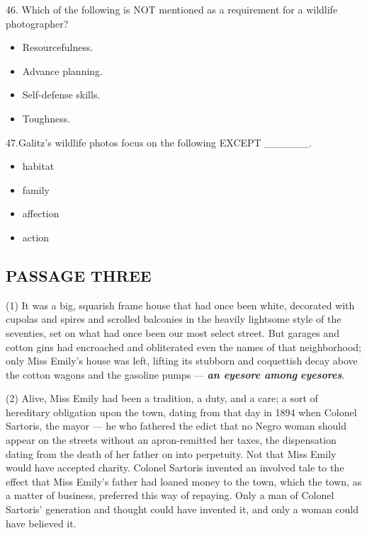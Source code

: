 \documentclass[UTF8,11pt]{ctexart}
\begin{document}
46. Which of the following is NOT mentioned as a requirement for a wildlife photographer?


\begin{itemize}[leftmargin=2em,itemsep=.2em,topsep=.4em]\item[A.] Resourcefulness.
\item[B.] Advance planning.
\item[C.] Self-defense skills.
\item[D.] Toughness.
\end{itemize}

47.Galitz’s wildlife photos focus on the following EXCEPT \_\_\_\_\_\_.


\begin{itemize}[leftmargin=2em,itemsep=.2em,topsep=.4em]\item[A.] habitat
\item[B.] family
\item[C.] affection
\item[D.] action
\end{itemize}

\subsection*{\textbf{PASSAGE THREE}}


(1) It was a big, squarish frame house that had once been white, decorated with cupolas and spires and scrolled balconies in the heavily lightsome style of the seventies, set on what had once been our most select street. But garages and cotton gins had encroached and obliterated even the names of that neighborhood; only Miss Emily’s house was left, lifting its stubborn and coquettish decay above the cotton wagons and the gasoline pumps — \textbf{\textit{an eyesore among}} \textbf{\textit{eyesores}}.


(2) Alive, Miss Emily had been a tradition, a duty, and a care; a sort of hereditary obligation upon the town, dating from that day in 1894 when Colonel Sartoris, the mayor — he who fathered the edict that no Negro woman should appear on the streets without an apron-remitted her taxes, the dispensation dating from the death of her father on into perpetuity. Not that Miss Emily would have accepted charity. Colonel Sartoris invented an involved tale to the effect that Miss Emily’s father had loaned money to the town, which the town, as a matter of business, preferred this way of repaying. Only a man of Colonel Sartoris’ generation and thought could have invented it, and only a woman could have believed it.
\end{document}
